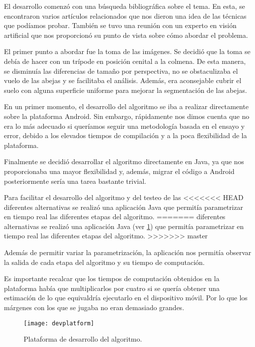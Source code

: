 El desarrollo comenzó con una búsqueda bibliográfica sobre el tema. En
esta, se encontraron varios artículos relacionados que nos dieron una
idea de las técnicas que podíamos probar. También se tuvo una reunión
con un experto en visión artificial que nos proporcionó su punto de
vista sobre cómo abordar el problema.

El primer punto a abordar fue la toma de las imágenes. Se decidió que la
toma se debía de hacer con un trípode en posición cenital a la colmena.
De esta manera, se disminuía las diferencias de tamaño por perspectiva,
no se obstaculizaba el vuelo de las abejas y se facilitaba el análisis.
Además, era aconsejable cubrir el suelo con alguna superficie uniforme
para mejorar la segmentación de las abejas.


En un primer momento, el desarrollo del algoritmo se iba a realizar
directamente sobre la plataforma Android. Sin embargo, rápidamente nos
dimos cuenta que no era lo más adecuado si queríamos seguir una
metodología basada en el ensayo y error, debido a los elevados tiempos
de compilación y a la poca flexibilidad de la plataforma.

Finalmente se decidió desarrollar el algoritmo directamente en Java, ya
que nos proporcionaba una mayor flexibilidad y, además, migrar el código
a Android posteriormente sería una tarea bastante trivial.

Para facilitar el desarrollo del algoritmo y del testeo de las
<<<<<<< HEAD
diferentes alternativas se realizó una aplicación Java que permitía
parametrizar en tiempo real las diferentes etapas del algoritmo.
=======
diferentes alternativas se realizó una aplicación Java (ver \ref{fig:devplatform1}) 
que permitía parametrizar en tiempo real las diferentes etapas del algoritmo.
>>>>>>> master

Además de permitir variar la parametrización, la aplicación nos permitía
observar la salida de cada etapa del algoritmo y su tiempo de
computación.

Es importante recalcar que los tiempos de computación obtenidos en la
plataforma había que multiplicarlos por cuatro si se quería obtener una
estimación de lo que equivaldría ejecutarlo en el dispositivo móvil. Por
lo que los márgenes con los que se jugaba no eran demasiado grandes.

\begin{figure}[H]
	\centering
	\texttt{[image: devplatform]}
	\caption{Plataforma de desarrollo del algoritmo.}
	\label{fig:devplatform1}
\end{figure}

